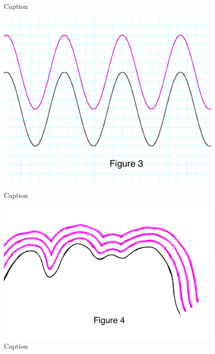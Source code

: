 \begin{figure}[h!]
\begin{minipage}[b]{0.3\linewidth}
    \caption{Caption} 
    \label{fig:fig2}
    \vspace{4ex}
  \end{minipage} %
  \begin{minipage}[b]{0.3\linewidth}
    \centering
    \includegraphics[width=.9\linewidth]{intro_img/Fig 3.png} 
    \caption{Caption} 
    \label{fig:fig3}
    \vspace{4ex}
  \end{minipage} %
  \begin{minipage}[b]{0.3\linewidth}
    \centering
    \includegraphics[width=.9\linewidth]{intro_img/Fig 4.png} 
    \caption{Caption} 
    \label{fig:fig4}
    \vspace{4ex}
  \end{minipage} %
\end{figure}

